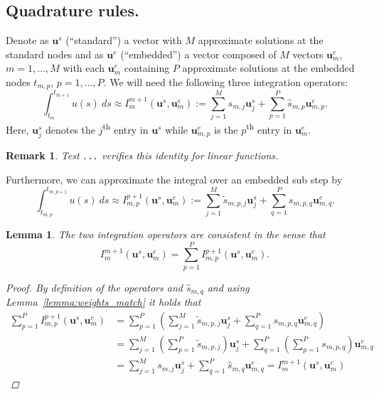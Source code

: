\documentclass{article}
\newtheorem{remark}{Remark}
\newtheorem{lemma}{Lemma}
\newcommand{\ve}[1]{\mathbf{#1}}
\begin{document}
\subsection*{Quadrature rules.}
Denote as $\ve{u}^{s}$ (``standard'') a vector with $M$ approximate solutions at the standard nodes and as $\ve{u}^{e}$ (``embedded'') a vector composed of $M$ vectors $\ve{u}^{e}_{m}$, $m=1,\ldots,M$ with each $\ve{u}^{e}_{m}$ containing $P$ approximate solutions at the embedded nodes $t_{m,p}$, $p=1, \ldots, P$.
We will need the following three integration operators:
\begin{equation}
	\int_{t_{m}}^{t_{m+1}} u(s)~ds \approx I_{m}^{m+1}(\ve{u}^s, \ve{u}^{e}_{m}) := \sum_{j=1}^{M} s_{m,j} \ve{u}^{s}_{j} + \sum_{p=1}^{P} \hat{s}_{m,p} \ve{u}^{e}_{m,p}.
\end{equation}
Here, $\ve{u}^{s}_{j}$ denotes the $j$\textsuperscript{th} entry in $\ve{u}^{s}$ while $\ve{u}^{e}_{m,p}$ is the $p$\textsuperscript{th} entry in $\ve{u}^{e}_{m}$.
\begin{remark}
Test \texttt{...} verifies this identity for linear functions.
\end{remark}
Furthermore, we can approximate the integral over an embedded sub step by
\begin{equation}
	\int_{t_{m,p}}^{t_{m,p+1}} u(s)~ds \approx I_{m,p}^{p+1}(\ve{u}^s, \ve{u}^{e}_{m}) := \sum_{j=1}^{M} \tilde{s}_{m,p,j} \ve{u}^{s}_{j} + \sum_{q=1}^{P} s_{m,p,q} \ve{u}^{e}_{m,q}.
\end{equation}
\begin{lemma}\label{lemma:quadrature_match}
The two integration operators are consistent in the sense that
\begin{equation}
	I_{m}^{m+1}(\ve{u}^s, \ve{u}^{e}_{m}) = \sum_{p=1}^{P} I_{m,p}^{p+1}(\ve{u}^s, \ve{u}^{e}_{m}).
\end{equation}
\begin{proof}
By definition of the operators and $\hat{s}_{m,q}$ and using Lemma~\ref{lemma:weights_match} it holds that
\begin{align*}
	\sum_{p=1}^{P} I_{m,p}^{p+1}(\ve{u}^s, \ve{u}^{e}_{m}) &= \sum_{p=1}^{P} \left( \sum_{j=1}^{M} \tilde{s}_{m,p,j} \ve{u}^{s}_j + \sum_{q=1}^{P} s_{m,p,q} \ve{u}^{e}_{m,q} \right) \\
		&= \sum_{j=1}^{M} \left( \sum_{p=1}^{P} \tilde{s}_{m,p,j} \right) \ve{u}^{s}_{j} + \sum_{q=1}^{P} \left( \sum_{p=1}^{P} s_{m,p,q} \right) \ve{u}^{e}_{m,q} \\
		&= \sum_{j=1}^{M} s_{m,j} \ve{u}^{s}_{j} + \sum_{q=1}^{P} \hat{s}_{m,q} \ve{u}^{e}_{m,q} = I_{m}^{m+1}(\ve{u}^s, \ve{u}^{e}_{m})
\end{align*}
\end{proof}
\end{lemma}
%
%
%
\end{document}
